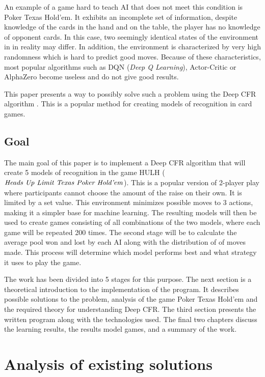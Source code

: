 \documentclass[12pt,oneside,a4paper]{report}
\begin{document}
An example of a game hard to teach AI that does not meet this condition is Poker Texas
Hold'em.
It exhibits an incomplete set of information, despite knowledge of the cards in the hand and 
on the table, the player has no
knowledge of 
opponent cards. In this case, two seemingly identical states of the environment in
in reality may differ. In addition, the environment is characterized by very high randomness
which is hard to predict good moves. Because of these characteristics, most popular algorithms
such as 
DQN (\emph{Deep Q Learning}), Actor-Critic or AlphaZero become useless and do not give good results.


This paper presents a way to possibly solve such a problem using the 
Deep CFR algorithm \cite{DCFR}. This is a popular method for creating models of
recognition in card games.

\section{Goal}
The main goal of this paper is to implement a Deep CFR algorithm that will create 5 models of
recognition in the game HULH ($\text{\emph{Heads Up Limit Texas 
Poker Hold'em}}$). This is a popular version of 2-player play where participants cannot choose
the amount of the raise on their own. It is limited by a set value. This environment
minimizes possible moves to 3 actions, making it a simpler base for machine learning. 
The resulting models will then be 
used to create
games consisting of all combinations of the two models, where each game will be 
repeated 200 times. The second stage
will be to calculate the average pool won and lost by each AI along with the distribution of
of moves made.
This process will determine which model performs best and what strategy it uses to play the game.


The work has been divided into 5 stages for this purpose.
The next section is a theoretical introduction to the implementation of the program. It describes 
possible solutions to the problem, analysis of the game Poker Texas Hold'em
and the required theory for understanding Deep CFR. 
The third section presents the written program along with the technologies used. The final two chapters 
discuss the learning results, the results
model games, and a summary of the work.

\chapter{Analysis of existing solutions}
\end{document}
